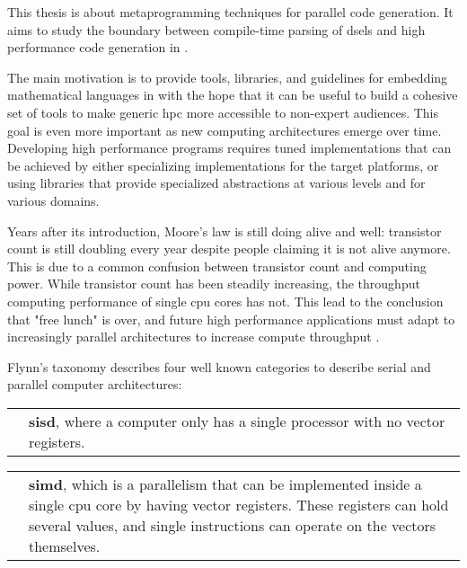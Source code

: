 \documentclass[main]{subfiles}
\begin{document}
This thesis is about metaprogramming techniques for parallel code generation.
It aims to study the boundary between compile-time parsing of
\glspl{dsel} and high performance code generation in \cpp.

The main motivation is to provide tools, libraries, and guidelines for embedding
mathematical languages in \cpp with the hope that it can be useful to build a
cohesive set of tools to make generic \gls{hpc} more accessible
to non-expert audiences. This goal is even more important as new computing
architectures emerge over time. Developing high performance programs requires
tuned implementations that can be achieved by either specializing
implementations for the target platforms, or using libraries that provide
specialized abstractions at various levels and for various domains.

Years after its introduction, Moore's law is still doing alive and well:
transistor count is still doubling every year despite people claiming
it is not alive anymore. This is due to a common confusion between
transistor count and computing power. While transistor count has been steadily
increasing, the throughput computing performance of single \gls{cpu} cores
has not.
This lead to the conclusion that "free lunch" is over, and future
high performance applications must adapt to increasingly parallel architectures
to increase compute throughput \cite{concurrency-revolution}.

Flynn's taxonomy \cite{flynn-taxonomy} describes four well known categories
to describe serial and parallel computer architectures\footnotemark{}:


\begin{center}
\begin{tabular}{ p{} p{} }

\raisebox{-.925\height}{}
&
\textbf{\gls{sisd}}, where a computer only has a single processor with no
vector registers.

\end{tabular}
\end{center}

\begin{center}
\begin{tabular}{ p{} p{} }

\raisebox{-.925\height}{}
&
\textbf{\gls{simd}}, which is a parallelism that can be implemented inside
a single \gls{cpu} core by having vector registers. These registers can hold
several values, and single instructions can operate on the vectors themselves.

\end{tabular}
\end{center}
\end{document}

